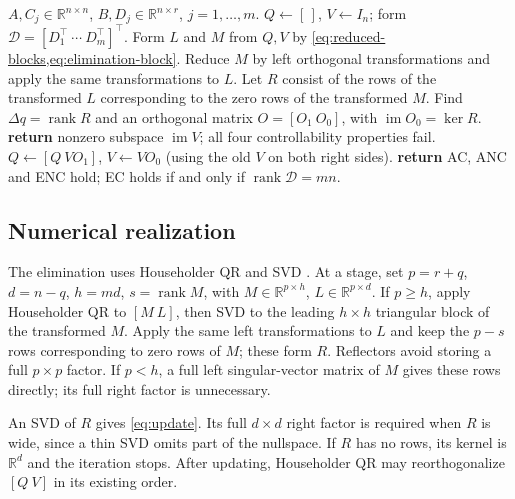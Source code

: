 \documentclass[twocolumn]{autart}
\newcounter{part}
\begin{document}
\vspace{-2mm}


\vspace{-2mm}

\begin{algorithm}[htbp]
\caption{Orthogonal elimination for the controllability criterion (exact arithmetic)}
\label{alg:staircase}
\begin{algorithmic}[1]
\Require $A,C_j\in\mathbb R^{n\times n}$, $B,D_j\in\mathbb R^{n\times r}$,
$j=1,\dots,m$.
\State $Q\gets[\,]$, $V\gets I_n$; form
$\mathcal D=[D_1^\top\ \cdots\ D_m^\top]^\top$.
\State Form $L$ and $M$ from $Q,V$ by
\cref{eq:reduced-blocks,eq:elimination-block}.
\State Reduce $M$ by left orthogonal transformations and apply the same
transformations to $L$.
\State Let $R$ consist of the rows of the transformed $L$ corresponding
to the zero rows of the transformed $M$.
\State Find $\Delta q=\operatorname{rank}R$ and an orthogonal matrix
$O=[O_1\ O_0]$, with $\operatorname{im}O_0=\ker R$.
\State \textbf{return} nonzero subspace $\operatorname{im}V$; all four
controllability properties fail.
\EndIf
\State $Q\gets[Q\ VO_1]$, $V\gets VO_0$ (using the old $V$ on
both right sides).
\State \textbf{return} AC, ANC and ENC hold; EC holds if and only if
$\operatorname{rank}\mathcal D=mn$.
\EndIf
\EndFor
\end{algorithmic}
\end{algorithm}

\subsection{Numerical realization}

The elimination uses Householder QR and SVD \cite{LAPACK}. At a stage, set \(p=r+q\), \(d=n-q\), \(h=md\), \(s=\operatorname{rank}M\), with \(M\in\mathbb R^{p\times h}\), \(L\in\mathbb R^{p\times d}\). If \(p\ge h\), apply Householder QR to \([M\ L]\), then SVD to the leading \(h\times h\) triangular block of the transformed \(M\). Apply the same left transformations to \(L\) and keep the \(p-s\) rows corresponding to zero rows of \(M\); these form \(R\). Reflectors avoid storing a full \(p\times p\) factor. If \(p<h\), a full left singular-vector matrix of \(M\) gives these rows directly; its full right factor is unnecessary.

An SVD of \(R\) gives \cref{eq:update}. Its full \(d\times d\) right factor is required when \(R\) is wide, since a thin SVD omits part of the nullspace. If \(R\) has no rows, its kernel is \(\mathbb R^d\) and the iteration stops. After updating, Householder QR may reorthogonalize \([Q\ V]\) in its existing order.
\end{document}
